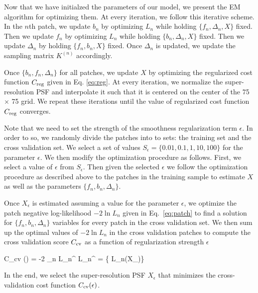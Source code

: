 Now that we have initialzed the parameters of our model, we present the EM algorithm for optimizing them. At every iteration, we follow this 
iterative scheme. In the $n$th patch, we update $b_n$ by optimizing $L_n$ while holding $\{f_n, \Delta_n, X\}$ fixed. Then 
we update $f_n$ by optimizing $L_n$ while holding $\{b_n, \Delta_n, X\}$ fixed. Then we update $\Delta_n$ by holding $\{f_n, b_n, X\}$ fixed. 
Once $\Delta_n$ is updated, we update the sampling matrix $K^{(n)}$ accordingly. 

Once $\{b_n, f_n, \Delta_n\}$ for all patches, we update $X$ 
by optimizing the regularized cost function $C_{\rm reg}$ given in Eq. \ref{eq:reg}. At every iteration, we normalize the super-resolution PSF and 
interpolate it such that it is centered on the center of the 75 $\times$ 75 grid. We repeat these iterations until the value of regularized cost function 
$C_{\rm reg}$ converges.

Note that we need to set the strength of the smoothness regularization term $\epsilon$. In order to so, we randomly divide the patches into to sets: 
the training set and the cross validation set. We select a set of values $S_{\epsilon} = \{0.01,0.1,1,10,100\}$ for the parameter $\epsilon$. We then modify the optimization 
procedure as follows. First, we select a value of $\epsilon$ from $S_{\epsilon}$. Then given the selected $\epsilon$ we follow the optimization procedure as described above to 
the patches in the training sample to estimate $X$ as well as the parameters $\{f_n,b_n,\Delta_n\}$. 

Once $X_{\epsilon}$ is estimated assuming a value for the parameter $\epsilon$, we optimize the patch negative log-likelihood $-2\ln L_n$ given in Eq.~\ref{eq:patch} to find a solution for $\{f_n,b_n,\Delta_n\}$
variables for every patch in the cross validation set. We then sum up the optimal values of $-2\ln L_n$ in the cross validation patches to compute the cross validation score $C_{\rm cv}$ as a function of 
regularization strength $\epsilon$

\beq
C_{\rm cv} (\epsilon) = -2 \sum_{n} \ln L_{n}^{\star} \;  \; L_{n}^{\star} =  \{ L_{n}(X_{\epsilon})\}
\eeq

In the end, we select the super-resolution PSF $X_{\epsilon}$ that minimizes the cross-validation cost function $C_{\rm cv} (\epsilon)$.


